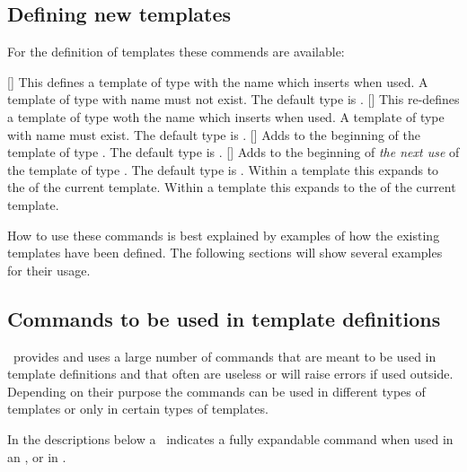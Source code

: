 \documentclass{acro-manual}
\begin{document}
\subsection{Defining new templates}\label{sec:defin-new-templ}
For the definition of templates these commends are available:
\begin{commands}
  []
    This defines a template of type  with the name 
    which inserts  when used.  A template of type  with
    name  must not exist.  The default type is .
  []
    This re-defines a template of type  woth the name 
    which inserts  when used.  A template of type  with
    name  must exist.  The default type is .
  []
    Adds  to the beginning of the template
     of type .  The default type is .
  []
    Adds  to the beginning of \emph{the next use}
    of the template  of type .  The default type is
    .
  \expandable{}
    Within a template this expands to the  of the current
    template.
  \expandable{}
    Within a template this expands to the  of the current
    template.
\end{commands}

How to use these commands is best explained by examples of how the existing
templates have been defined.  The following sections will show several
examples for their usage.

\subsection{Commands to be used in template definitions}

\acro\ provides and uses a large number of commands that are meant to be used
in template definitions and that often are useless or will raise errors if
used outside.  Depending on their purpose the commands can be used in
different types of templates or only in certain types of templates.

In the descriptions below a \expandablesymbol\ indicates a fully expandable
command when used in an ,  or in .
\end{document}

